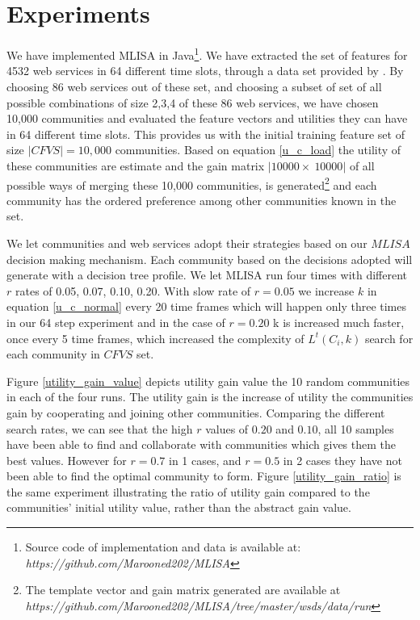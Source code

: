 \documentclass[10pt,journal,cspaper,compsoc]{IEEEtran}
\begin{document}
\section{Experiments}\label{s:experiments}
We have implemented MLISA in Java\footnote{Source code of implementation and data is available at: \emph{https://github.com/Marooned202/MLISA}}. We have extracted the set of features for 4532 web services in 64 different time slots, through a data set provided by \cite{10.1109/ISSRE.2011.17}. By choosing 86 web services out of these set, and choosing a subset of set of all possible combinations of size 2,3,4 of these 86 web services, we have chosen 10,000 communities and evaluated the feature vectors and utilities they can have in 64 different time slots. This provides us with the initial training feature set of size $|CFVS| = 10,000$ communities. Based on equation \ref{u_c_load} the utility of these communities are estimate and the gain matrix $|10000 \times~ 10000|$ of all possible ways of merging these 10,000 communities, is generated\footnote {The template vector and gain matrix generated are available at \emph{https://github.com/Marooned202/MLISA/tree/master/wsds/data/run}} and each community has the ordered preference among other communities known in the set. 

We let communities and web services adopt their strategies based on our $MLISA$ decision making mechanism. Each community based on the decisions adopted will generate with a decision tree profile. We let MLISA run four times with different $r$ rates of 0.05, 0.07, 0.10, 0.20. With slow rate of $r = 0.05$ we increase $k$ in equation \ref{u_c_normal} every 20 time frames which will happen only three times in our 64 step experiment and in the case of $r = 0.20$ k is increased much faster, once every 5 time frames, which increased the complexity of $L^t(C_i,k)$ search for each community in $CFVS$ set. 

Figure \ref{utility_gain_value} depicts utility gain value the 10 random communities in each of the four runs. The utility gain is the increase of utility the communities gain by cooperating and joining other communities. Comparing the different search rates, we can see that the high $r$ values of $0.20$ and $0.10$, all 10 samples have been able to find and collaborate with communities which gives them the best values. However for $r=0.7$ in 1 cases, and $r=0.5$ in 2 cases they have not been able to find the optimal community to form. Figure \ref{utility_gain_ratio} is the same experiment illustrating the ratio of utility gain compared to the communities' initial utility value, rather than the abstract gain value.
\end{document}
